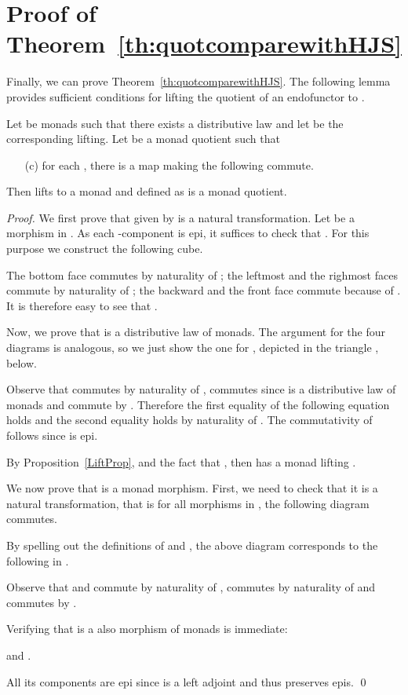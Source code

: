 \documentclass[oribibl,envcountsame,envcountsect,runningheads]{llncs}
\renewcommand{\>}{\rangle}
\begin{document}
\section{Proof of Theorem~\ref{th:quotcomparewithHJS}}
Finally, we can prove Theorem~\ref{th:quotcomparewithHJS}. The following lemma provides sufficient conditions for lifting the quotient of an endofunctor to .
\begin{proposition}\label{lemma:quotient}
Let  be monads such that there exists a distributive law  and
 let  be the corresponding lifting.
 Let  be a monad quotient  such that
\begin{itemize}
\item[(c)] for each , there is a map
  making the following commute.
 
 \end{itemize}
 Then  lifts to a monad
  and  defined as  is a monad quotient.
\end{proposition}
\begin{proof}
We first prove that  given by  is a natural transformation.
Let  be a morphism in . As each -component is epi, it suffices to check that . For this purpose we construct the following cube.
 
The bottom face commutes by naturality of ; the leftmost and the righmost faces commute by naturality of ; the backward and the front face commute because of . It is therefore easy to see that .

Now, we prove that  is a distributive law of monads. The argument for the four diagrams is analogous, so we just show the one for , depicted in the triangle , below.

Observe that  commutes by naturality of ,  commutes since  is a distributive law of monads and  commute by .
Therefore the first equality of the following equation holds  and the second equality holds by naturality of . The commutativity of  follows since  is epi.

By Proposition~\ref{LiftProp}, and the fact that , then  has a monad lifting .

We now prove that  is a monad morphism. First, we need to check that it is a natural transformation, that is for all morphisms  in , the following diagram commutes.

By spelling out the definitions of  and , the above diagram corresponds to the following in .

Observe that  and  commute by naturality of ,  commutes by naturality of  and  commutes by .

Verifying that  is a also morphism of monads is immediate:

and .

All its components are epi since  is a left adjoint and thus preserves epis.
\qed
\end{proof}
\end{document}
